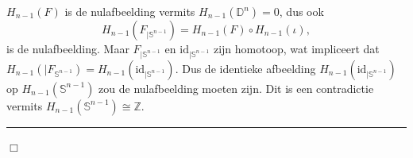 \documentclass[12pt]{book}
\newcommand{\Z}{\mathbb{Z}}
\newcommand{\D}{\mathbb{D}}
\newcommand{\Sf}{\mathbb{S}}
\newcommand{\bew}{{\sc Bewijs: }}
\newcommand{\B}{\rule{1mm}{0mm} \hfill $\Box$ }
\newtheorem{stelh}{$\!\!$}[section]
\newenvironment{stel}{\begin{stelh}{\em {\bf Stelling }}}{\end{stelh}}
\newtheorem{opmh}[stelh]{$\!\!$}
\newenvironment{opm}{\begin{opmh}{\em {\bf Opmerking }}}{\end{opmh}}
\newtheorem{dfh}[stelh]{$\!\!$}
\newenvironment{df}{\begin{dfh} \em {\bf Definitie }}{\end{dfh}}
\begin{document}
$H_{n-1}(F)$ is de nulafbeelding vermits $H_{n-1}(\D^{n})=0$, dus ook 
$$H_{n-1}(F_{\vert\Sf^{n-1}})=H_{n-1}(F)\circ H_{n-1}(\iota),$$
is de nulafbeelding. Maar 
$F_{|\Sf^{n-1}}$ en $\mbox{id}_{|\Sf^{n-1}}$ zijn homotoop, wat impliceert dat $H_{n-1}(\vert F_{\Sf^{n-1}})=H_{n-1}(\mbox{id}_{\vert\Sf^{n-1}})$. Dus de identieke afbeelding $H_{n-1}(\mbox{id}_{\vert\Sf^{n-1}})$ op $H_{n-1}(\Sf^{n-1})$ zou de nulafbeelding moeten zijn. Dit is een contradictie vermits $H_{n-1}(\Sf^{n-1})\cong \Z$. \B


%
%
%
%
%
%
%
%
\end{document}
